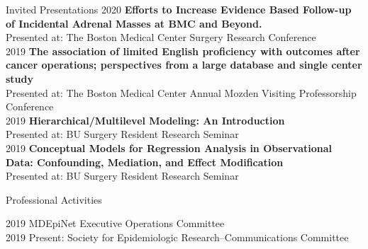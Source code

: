 \documentclass{resume} %
\begin{document}
\begin{rSection}{Invited Presentations}
   2020 \enspace \textbf{Efforts to Increase Evidence Based Follow-up of Incidental Adrenal Masses at BMC and Beyond.
   }\\
   \hspace*{2mm}Presented at: The Boston Medical Center Surgery Research Conference\\
   2019 \enspace \textbf{The association of limited English proficiency with outcomes after cancer operations; perspectives from a large database and single center study}\\
   \hspace*{2mm}Presented at: The Boston Medical Center Annual Mozden Visiting Professorship Conference\\
   2019 \enspace \textbf{Hierarchical/Multilevel Modeling: An Introduction}\\
   \hspace*{2mm}Presented at: BU Surgery Resident Research Seminar\\
   2019 \enspace \textbf{Conceptual Models for Regression Analysis in Observational Data: Confounding, Mediation, and Effect Modification}\\
   \hspace*{2mm}Presented at: BU Surgery Resident Research Seminar  
   
   \end{rSection}



\begin{rSection}{Professional Activities}
   
   2019 \enspace MDEpiNet Executive Operations Committee\\
   2019 \enspace Present: Society for Epidemiologic Research--Communications Committee
   
   \end{rSection}


\end{document}
